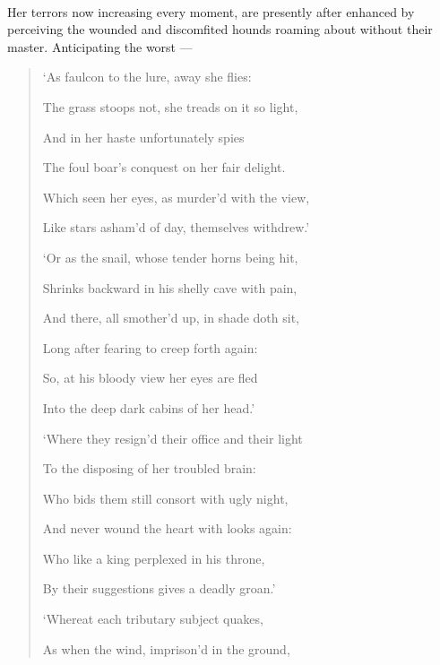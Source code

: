 \documentclass[a4paper, 11pt, oneside, polutonikogreek, english]{article}
\begin{document}
\paragraph{}
Her terrors now increasing every moment, are presently after enhanced by perceiving the wounded and discomfited hounds roaming about without their master. Anticipating the worst --- 
\begin{quotation}\footnotesize
`As faulcon to the lure, away she flies:

The grass stoops not, she treads on it so light,

And in her haste unfortunately spies

The foul boar's conquest on her fair delight.

\hspace*{15mm}Which seen her eyes, as murder'd with the view,

\hspace*{15mm}Like stars asham'd of day, themselves withdrew.'

\bigskip

`Or as the snail, whose tender horns being hit,

Shrinks backward in his shelly cave with pain,

And there, all smother'd up, in shade doth sit,

Long after fearing to creep forth again:

\hspace*{15mm}So, at his bloody view her eyes are fled

\hspace*{15mm}Into the deep dark cabins of her head.'

\bigskip

`Where they resign'd their office and their light

To the disposing of her troubled brain:

Who bids them still consort with ugly night,

And never wound the heart with looks again:

\hspace*{15mm}Who like a king perplexed in his throne,

\hspace*{15mm}By their suggestions gives a deadly groan.'

\bigskip

`Whereat each tributary subject quakes,

As when the wind, imprison'd in the ground,


\end{quotation}
\end{document}
